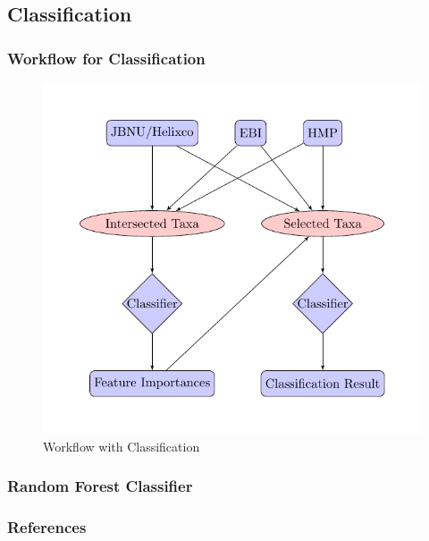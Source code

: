 \documentclass{beamer}
\begin{document}
    \subsection{Classification}
    \begin{frame}
        \frametitle{Workflow for Classification}

        \begin{figure}
            \includegraphics[width=0.5 \linewidth]{figures/tikz/classification.pdf}
            \caption{Workflow with Classification}
        \end{figure}
    \end{frame}

    \begin{frame}[allowframebreaks]
        \frametitle{Random Forest Classifier}
    \end{frame}

   	\begin{frame}[allowframebreaks]
        \frametitle{References}
        
        
    \end{frame}
\end{document}
